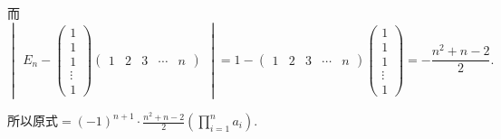 \documentclass[12pt,fontset=fandol]{ctexart}
\begin{document}
\begin{solve}
            而 \[ \begin{vmatrix}E_n-\begin{pmatrix}
                        1 \\1\\1\\\vdots\\1
                    \end{pmatrix}\begin{pmatrix}1 & 2 & 3 & \cdots & n\end{pmatrix}\end{vmatrix}
                =1-\begin{pmatrix}1 & 2 & 3 & \cdots & n\end{pmatrix}
                \begin{pmatrix}1 \\ 1 \\ 1 \\ \vdots \\ 1\end{pmatrix}
                =-\frac{n^2+n-2}{2}. \]

            所以原式$\displaystyle =(-1)^{n+1} \cdot \frac{n^2+n-2}{2} \left(\prod_{i=1}^na_i \right)$.
\end{solve}
\end{document}

